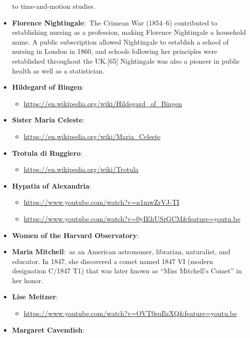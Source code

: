 \documentclass[11pt,a4paper]{article}
\begin{document}
\begin{itemize}
    to time-and-motion studies.
    \item \textbf{Florence Nightingale}:\ The Crimean War (1854–6) contributed to establishing nursing as a profession, making Florence Nightingale a household name. 
    A public subscription allowed Nightingale to establish a school of nursing in London in 1860, and schools following her principles were established throughout the 
    UK.[65] Nightingale was also a pioneer in public health as well as a statistician.
    \item \textbf{Hildegard of Bingen}:\
    \begin{itemize}
      \item[] \url{https://en.wikipedia.org/wiki/Hildegard_of_Bingen}
    \end{itemize}
    \item \textbf{Sister Maria Celeste}:\
    \begin{itemize}
      \item[] \url{https://en.wikipedia.org/wiki/Maria_Celeste} 
    \end{itemize}
    \item \textbf{Trotula di Ruggiero}:\ 
    \begin{itemize}
      \item[] \url{https://en.wikipedia.org/wiki/Trotula} 
    \end{itemize}
    \item \textbf{Hypatia of Alexandria}:\ 
    \begin{itemize}
      \item[] \url{https://www.youtube.com/watch?v=n1mwZrVJ-TI}
      \item[] \url{https://www.youtube.com/watch?v=0yIEhUSrGCM&feature=youtu.be}
    \end{itemize}
    \item \textbf{Women of the Harvard Observatory}:\
    \item \textbf{Maria Mitchell}:\ as an American astronomer, librarian, naturalist, and educator. In 1847, she discovered a comet named 1847 VI (modern designation C/1847 T1) 
    that was later known as ``Miss Mitchell’s Comet'' in her honor.
    \item \textbf{Lise Meitner}:\
    \begin{itemize}
      \item [] \url{https://www.youtube.com/watch?v=OVT0suIlzXQ&feature=youtu.be}
    \end{itemize}
    \item \textbf{Margaret Cavendish}:\ 

\end{itemize}
\end{document}

